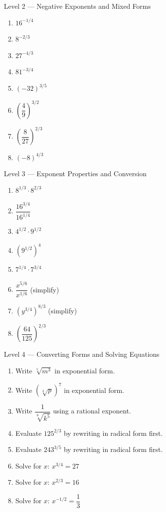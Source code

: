 \documentclass[12pt]{article}
\begin{document}
\begin{practicebox}{Level 2 --- Negative Exponents and Mixed Forms}
\begin{enumerate}[label=\textbf{\arabic*.},leftmargin=*,itemsep=8pt]
  \item $16^{-1/4}$
  \item $8^{-2/3}$
  \item $27^{-4/3}$
  \item $81^{-3/4}$
  \item $(-32)^{3/5}$
  \item $\left(\dfrac{4}{9}\right)^{3/2}$
  \item $\left(\dfrac{8}{27}\right)^{2/3}$
  \item $(-8)^{4/3}$
\end{enumerate}
\end{practicebox}

\begin{practicebox}{Level 3 --- Exponent Properties and Conversion}
\begin{enumerate}[label=\textbf{\arabic*.},leftmargin=*,itemsep=8pt]
  \item $8^{1/3}\cdot8^{2/3}$
  \item $\dfrac{16^{3/4}}{16^{1/4}}$
  \item $4^{1/2}\cdot9^{1/2}$
  \item $(9^{1/2})^4$
  \item $7^{1/4}\cdot7^{3/4}$
  \item $\dfrac{x^{5/6}}{x^{1/6}}$ \quad(simplify)
  \item $(y^{3/4})^{8/3}$ \quad(simplify)
  \item $\left(\dfrac{64}{125}\right)^{2/3}$
\end{enumerate}
\end{practicebox}

\begin{practicebox}{Level 4 --- Converting Forms and Solving Equations}
\begin{enumerate}[label=\textbf{\arabic*.},leftmargin=*,itemsep=8pt]
  \item Write $\sqrt[5]{m^3}$ in exponential form.
  \item Write $(\sqrt[4]{p})^7$ in exponential form.
  \item Write $\dfrac{1}{\sqrt[6]{k^5}}$ using a rational exponent.
  \item Evaluate $125^{2/3}$ by rewriting in radical form first.
  \item Evaluate $243^{3/5}$ by rewriting in radical form first.
  \item Solve for $x$:\; $x^{3/4}=27$
  \item Solve for $x$:\; $x^{2/3}=16$
  \item Solve for $x$:\; $x^{-1/2}=\dfrac{1}{3}$
\end{enumerate}
\end{practicebox}
\end{document}
